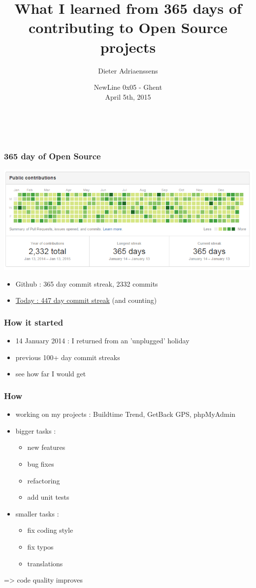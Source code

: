\documentclass[14pt]{beamer}
\title[365 days of Open Source]{What I learned from 365 days of contributing to Open Source projects}
\author{Dieter Adriaenssens}
\institute[]{Open Source developer - @dcadriaenssens}
\date[NewLine 0x05 5Apr2015]{NewLine 0x05 - Ghent\\
April 5th, 2015}
\begin{document}
  \begin{frame}
    \titlepage
    \vfill
    \begin{center}
      \\[2.5ex]
        {\tiny\CcNote{\CcLongnameByNcSa}}
        \vspace*{-2.5ex}
    \end{center}
  \end{frame}
  \begin{frame}
    \frametitle{365 day of Open Source}
    \includegraphics[scale=.45]{github_oss365_13jan2015.png}
    \begin{itemize}
      \item Github : 365 day commit streak, 2332 commits
      \item \href{https://github.com/ruleant}{Today : 447 day commit streak} (and counting)
    \end{itemize}
  \end{frame}
  \begin{frame}
    \frametitle{How it started}
    \begin{itemize}
      \item 14 January 2014 : I returned from an 'unplugged' holiday
      \item previous 100+ day commit streaks
      \item see how far I would get
    \end{itemize}
  \end{frame}
  \begin{frame}
    \frametitle{How}
    \begin{itemize}
      \item working on my projects : Buildtime Trend, GetBack GPS, phpMyAdmin
      \item bigger tasks :
      \begin{itemize}
        \item new features
        \item bug fixes
        \item refactoring
        \item add unit tests
      \end{itemize}
      \item smaller tasks :
      \begin{itemize}
        \item fix coding style
        \item fix typos
        \item translations
      \end{itemize}
    \end{itemize}
    => code quality improves
  \end{frame}
\end{document}
